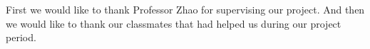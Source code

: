 \documentclass[../main.tex]{subfiles}
\begin{document}
First we would like to thank Professor Zhao for supervising our project.  And then we would like to thank our classmates that had helped us during our project period.
\end{document}
